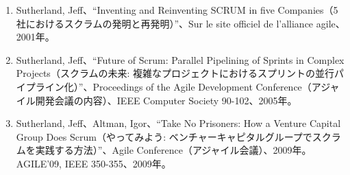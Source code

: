 \documentclass[12pt,a4paper,parskip=full]{scrartcl}
\begin{document}
\begin{enumerate}
\item
  Sutherland, Jeff、“Inventing and Reinventing SCRUM in five Companies（5社におけるスクラムの発明と再発明）”、Sur le site officiel de l’alliance agile、2001年。
\item
  Sutherland, Jeff、“Future of Scrum: Parallel Pipelining of Sprints in Complex Projects（スクラムの未来: 複雑なプロジェクトにおけるスプリントの並行パイプライン化）”、Proceedings of the Agile Development Conference（アジャイル開発会議の内容）、IEEE Computer Society 90-102、2005年。
\item
  Sutherland, Jeff、Altman, Igor、“Take No Prisoners: How a Venture Capital Group Does Scrum（やってみよう: ベンチャーキャピタルグループでスクラムを実践する方法）”、Agile Conference（アジャイル会議）、2009年。AGILE’09, IEEE 350-355、2009年。
\end{enumerate}
\end{document}
